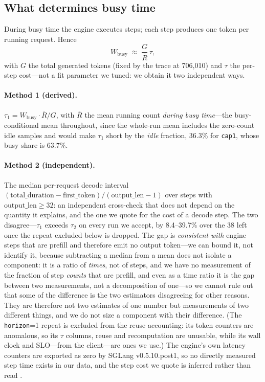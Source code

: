 \subsection{What determines busy time}

During busy time the engine executes steps; each step produces one token per
running request. Hence \cite{little1961}
\begin{equation}
  W_{\text{busy}} \;\approx\; \frac{G}{\overline{R}}\,\tau ,
  \label{eq:busy}
\end{equation}
with $G$ the total generated tokens (fixed by the trace at 706{,}010) and $\tau$
the per-step cost---not a fit parameter we tuned: we obtain it two independent
ways.

\paragraph{Method 1 (derived).} $\tau_1 = W_{\text{busy}} \cdot \overline{R} / G$,
with $\overline{R}$ the mean running count \emph{during busy time}---the
busy-conditional mean throughout, since the whole-run mean includes the zero-count
idle samples and would make $\tau_1$ short by the \emph{idle} fraction, 36.3\% for
\texttt{cap1}, whose busy share is 63.7\%.

\paragraph{Method 2 (independent).} The median per-request decode interval
$(\text{total\_duration} - \text{first\_token}) / (\text{output\_len} - 1)$ over
steps with $\text{output\_len} \ge 32$: an independent cross-check that does not
depend on the quantity it explains, and the one we quote for the cost of a decode
step. The two disagree---$\tau_1$ exceeds $\tau_2$ on every
run we accept, by 8.4--39.7\% over the 38 left once the repeat excluded below is
dropped. The gap
is \emph{consistent with} engine steps that are prefill and therefore emit no
output token---we can bound it, not identify it, because subtracting a median from
a mean does not isolate a component: it is a ratio of \emph{times}, not of steps,
and we have no measurement of the fraction of step \emph{counts} that are
prefill, and even as a time ratio it is the gap between two measurements, not a
decomposition of one---so we cannot rule out that some of the difference is the two
estimators disagreeing for other reasons. They are therefore not two estimates of one number
but measurements of two different things, and we do not size a component with their
difference.
(The \texttt{horizon}=1 repeat is excluded from the reuse accounting: its token
counters are anomalous, so its $\tau$ columns, reuse and recomputation are
unusable, while its wall clock and SLO---from the client---are ones we use.) The
engine's own latency counters are exported as zero by SGLang v0.5.10.post1, so no
directly measured step time exists in our data, and the step cost we quote is
inferred rather than read \cite{fwagnostic}.

